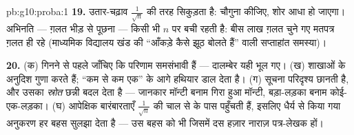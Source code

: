 \begin{solution}{pb:g10:proba:1}
\textbf{19.} उतार-चढ़ाव $\frac{1}{\sqrt n}$ की तरह सिकुड़ता है:  चौगुना कीजिए,
शोर आधा हो जाएगा। अभिनति --- ग़लत भीड़ से पूछना --- किसी भी $n$ पर बची
रहती है: बीस लाख ग़लत चुने गए मतपत्र ग़लत ही रहे (माध्यमिक विद्यालय खंड की
``आँकड़े कैसे झूठ बोलते हैं'' वाली सप्ताहांत समस्या)।

\textbf{20.} (क) गिनने से पहले जाँचिए कि परिणाम समसंभावी हैं --- दालम्बेर
यही भूल गए। (ख)  शाखाओं के अनुदिश गुणा करते हैं; ``कम से कम एक''
 के आगे हथियार डाल देता है। (ग) सूचना परिदृश्य छानती है, और उसका
\emph{स्रोत} छन्नी बदल देता है --- जानकार मॉन्टी बनाम गिरा हुआ मॉन्टी,
बड़ा-लड़का बनाम कोई-एक-लड़का। (घ) आपेक्षिक बारंबारताएँ $\frac{1}{\sqrt n}$ की चाल से
 के पास पहुँचती हैं, इसलिए धैर्य से किया गया अनुकरण हर बहस
सुलझा देता है --- उस बहस को भी जिसमें दस हज़ार नाराज़ पत्र-लेखक हों।
\end{solution}
